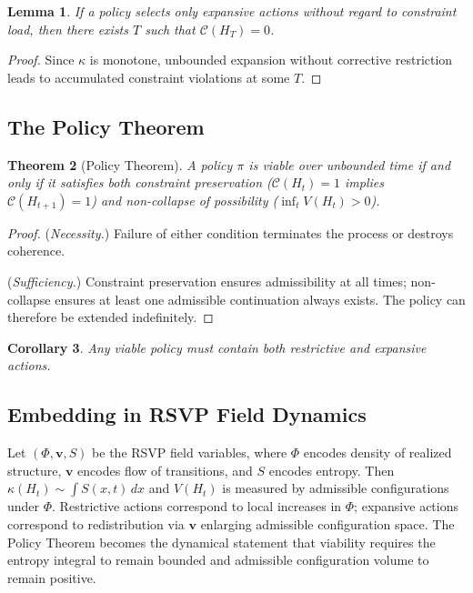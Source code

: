 \documentclass[12pt, a4paper]{article}
\theoremstyle{plain}
\newtheorem{theorem}{Theorem}[section]
\newtheorem{lemma}[theorem]{Lemma}
\newtheorem{corollary}[theorem]{Corollary}
\theoremstyle{definition}
\theoremstyle{remark}
\begin{document}
\begin{lemma}
If a policy selects only expansive actions without regard to constraint load, then there exists $T$ such that $\mathcal{C}(H_T) = 0$.
\end{lemma}

\begin{proof}
Since $\kappa$ is monotone, unbounded expansion without corrective restriction leads to accumulated constraint violations at some $T$.
\end{proof}

\subsection{The Policy Theorem}

\begin{theorem}[Policy Theorem]
\label{thm:policy}
A policy $\pi$ is viable over unbounded time if and only if it satisfies both constraint preservation ($\mathcal{C}(H_t) = 1$ implies $\mathcal{C}(H_{t+1}) = 1$) and non-collapse of possibility ($\inf_t V(H_t) > 0$).
\end{theorem}

\begin{proof}
(\textit{Necessity.}) Failure of either condition terminates the process or destroys coherence.

(\textit{Sufficiency.}) Constraint preservation ensures admissibility at all times; non-collapse ensures at least one admissible continuation always exists. The policy can therefore be extended indefinitely.
\end{proof}

\begin{corollary}
Any viable policy must contain both restrictive and expansive actions.
\end{corollary}

\subsection{Embedding in RSVP Field Dynamics}

Let $(\Phi, \mathbf{v}, S)$ be the RSVP field variables, where $\Phi$ encodes density of realized structure, $\mathbf{v}$ encodes flow of transitions, and $S$ encodes entropy. Then $\kappa(H_t) \sim \int S(x,t)\,dx$ and $V(H_t)$ is measured by admissible configurations under $\Phi$. Restrictive actions correspond to local increases in $\Phi$; expansive actions correspond to redistribution via $\mathbf{v}$ enlarging admissible configuration space. The Policy Theorem becomes the dynamical statement that viability requires the entropy integral to remain bounded and admissible configuration volume to remain positive.
\end{document}

